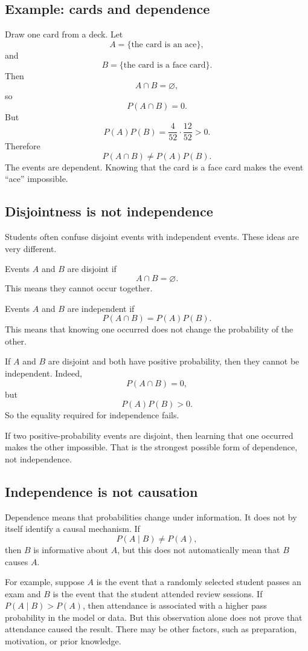\subsection*{Example: cards and dependence}

Draw one card from a deck. Let
\[
A=\{\text{the card is an ace}\},
\]
and
\[
B=\{\text{the card is a face card}\}.
\]
Then
\[
A\cap B=\varnothing,
\]
so
\[
P(A\cap B)=0.
\]
But
\[
P(A)P(B)=\frac4{52}\cdot\frac{12}{52}>0.
\]
Therefore
\[
P(A\cap B)\neq P(A)P(B).
\]
The events are dependent. Knowing that the card is a face card makes the event
``ace'' impossible.

\subsection*{Disjointness is not independence}

Students often confuse disjoint events with independent events. These ideas are
very different.

Events \(A\) and \(B\) are disjoint if
\[
A\cap B=\varnothing.
\]
This means they cannot occur together.

Events \(A\) and \(B\) are independent if
\[
P(A\cap B)=P(A)P(B).
\]
This means that knowing one occurred does not change the probability of the
other.

If \(A\) and \(B\) are disjoint and both have positive probability, then they
cannot be independent. Indeed,
\[
P(A\cap B)=0,
\]
but
\[
P(A)P(B)>0.
\]
So the equality required for independence fails.

\begin{remarkbox}
If two positive-probability events are disjoint, then learning that one occurred
makes the other impossible. That is the strongest possible form of dependence,
not independence.
\end{remarkbox}

\subsection*{Independence is not causation}

Dependence means that probabilities change under information. It does not by
itself identify a causal mechanism. If
\[
P(A\mid B)\neq P(A),
\]
then \(B\) is informative about \(A\), but this does not automatically mean that
\(B\) causes \(A\).

For example, suppose \(A\) is the event that a randomly selected student passes
an exam and \(B\) is the event that the student attended review sessions. If
\(P(A\mid B)>P(A)\), then attendance is associated with a higher pass
probability in the model or data. But this observation alone does not prove that
attendance caused the result. There may be other factors, such as preparation,
motivation, or prior knowledge.

